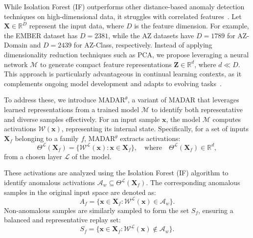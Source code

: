 While Isolation Forest (IF) outperforms other distance-based anomaly detection techniques on high-dimensional data, it struggles with correlated features~\cite{puggini2018enhanced}. Let \( \mathbf{X} \in \mathbb{R}^D \) represent the input data, where \( D \) is the feature dimension. For example, the EMBER dataset has \( D = 2381 \), while the AZ datasets have \( D = 1789 \) for AZ-Domain and \( D = 2439 \) for AZ-Class, respectively. Instead of applying dimensionality reduction techniques such as PCA, we propose leveraging a neural network \( \mathcal{M} \) to generate compact feature representations \( \mathbf{Z} \in \mathbb{R}^d \), where \( d \ll D \). This approach is particularly advantageous in continual learning contexts, as it complements ongoing model development and adapts to evolving tasks~\cite{hayes2020remind,ostapenko2022foundational}.

To address these, we introduce MADAR$^\theta$, a variant of MADAR that leverages learned representations from a trained model \( \mathcal{M} \) to identify both representative and diverse samples effectively. 
For an input sample \( \mathbf{x} \), the model \( \mathcal{M} \) computes activations \( \mathcal{W}(\mathbf{x}) \), representing its internal state. Specifically, for a set of inputs \( \mathbf{X}_f \) belonging to a family \( f \), MADAR$^\theta$ extracts activations:
\begin{equation}
\Theta^\mathcal{L}(\mathbf{X}_f) = \{ \mathcal{W}^\mathcal{L}(\mathbf{x}) : \mathbf{x} \in \mathbf{X}_f \}, \quad \text{where} \quad \Theta^\mathcal{L}(\mathbf{X}_f) \in \mathbb{R}^d,
\end{equation}
from a chosen layer \( \mathcal{L} \) of the model.

These activations are analyzed using the Isolation Forest (IF) algorithm to identify anomalous activations \( \mathcal{A}_w \subseteq \Theta^\mathcal{L}(\mathbf{X}_f) \). The corresponding anomalous samples in the original input space are denoted as:
\begin{equation}
A_f = \{ \mathbf{x} \in \mathbf{X}_f : \mathcal{W}^\mathcal{L}(\mathbf{x}) \in \mathcal{A}_w \}.
\end{equation}
Non-anomalous samples are similarly sampled to form the set \( S_f \), ensuring a balanced and representative replay set:
\begin{equation}
S_f = \{ \mathbf{x} \in \mathbf{X}_f : \mathcal{W}^\mathcal{L}(\mathbf{x}) \notin \mathcal{A}_w \}.
\end{equation}

